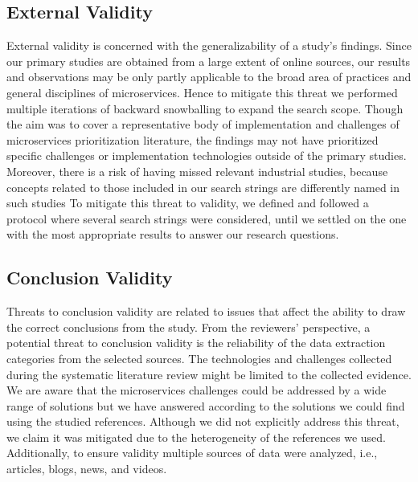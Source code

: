 \subsection{External Validity}
External validity is concerned with the generalizability of a study’s
findings.\cite{Kitchenham2007} Since our primary studies are obtained from a large extent of online sources, our results and observations may be only partly applicable to the broad area of practices and general disciplines of microservices. Hence to mitigate this threat we performed multiple iterations of backward snowballing to expand the search scope.
%
Though the aim was to
cover a representative body of implementation and challenges of microservices prioritization literature, the findings may not have prioritized specific challenges or implementation technologies outside of the primary studies. 
Moreover, there is a risk of having missed relevant industrial studies, because concepts related to those included in our search strings are differently named in such studies %
To mitigate this threat to validity, we defined and followed a protocol where several search strings were considered, until we settled on the one with the most appropriate results to answer our research questions.



\subsection{Conclusion Validity} 
Threats to conclusion validity are related to issues that affect the ability to draw the correct conclusions from the study.\cite{Kitchenham2007} From the reviewers’ perspective, a potential threat to conclusion validity is the reliability of the data extraction categories from the selected sources. The technologies and challenges collected during the systematic literature review might be limited to the collected evidence. We are aware that the microservices challenges could be addressed by a wide range of solutions but we have answered according to the solutions we could find using the studied references. Although we did not explicitly address this threat, we claim it was mitigated due to the heterogeneity of the references we used. Additionally, to ensure validity multiple sources of data were analyzed, i.e., articles, blogs, news, and videos. %

